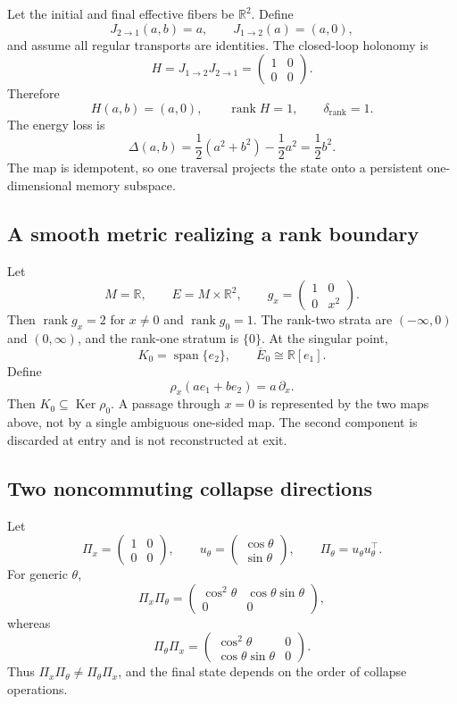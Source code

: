 \documentclass[11pt]{article}
\newcommand{\R}{\mathbb{R}}
\newcommand{\Ker}{\operatorname{Ker}}
\newcommand{\rank}{\operatorname{rank}}
\newcommand{\Span}{\operatorname{span}}
\begin{document}
Let the initial and final effective fibers be $\R^2$. Define
\[
J_{2\to1}(a,b)=a,
\qquad
J_{1\to2}(a)=(a,0),
\]
and assume all regular transports are identities. The closed-loop holonomy is
\[
H=J_{1\to2}J_{2\to1}
=\begin{pmatrix}1&0\\0&0\end{pmatrix}.
\]
Therefore
\[
H(a,b)=(a,0),
\qquad
\rank H=1,
\qquad
\delta_{\mathrm{rank}}=1.
\]
The energy loss is
\[
\Delta(a,b)=\frac12(a^2+b^2)-\frac12a^2=\frac12b^2.
\]
The map is idempotent, so one traversal projects the state onto a persistent
one-dimensional memory subspace.

\subsection{A smooth metric realizing a rank boundary}

Let
\[
M=\R,
\qquad
E=M\times\R^2,
\qquad
g_x=\begin{pmatrix}1&0\\0&x^2\end{pmatrix}.
\]
Then $\rank g_x=2$ for $x\ne0$ and $\rank g_0=1$. The rank-two strata are
$(-\infty,0)$ and $(0,\infty)$, and the rank-one stratum is $\{0\}$. At the
singular point,
\[
K_0=\Span\{e_2\},
\qquad
\overline E_0\cong\R[e_1].
\]
Define
\[
\rho_x(ae_1+be_2)=a\,\partial_x.
\]
Then $K_0\subseteq\Ker\rho_0$. A passage through $x=0$ is represented by the
two maps above, not by a single ambiguous one-sided map. The second component
is discarded at entry and is not reconstructed at exit.

\subsection{Two noncommuting collapse directions}

Let
\[
\Pi_x=\begin{pmatrix}1&0\\0&0\end{pmatrix},
\qquad
u_\theta=\begin{pmatrix}\cos\theta\\\sin\theta\end{pmatrix},
\qquad
\Pi_\theta=u_\theta u_\theta^\top.
\]
For generic $\theta$,
\[
\Pi_x\Pi_\theta
=\begin{pmatrix}
\cos^2\theta&\cos\theta\sin\theta\\
0&0
\end{pmatrix},
\]
whereas
\[
\Pi_\theta\Pi_x
=\begin{pmatrix}
\cos^2\theta&0\\
\cos\theta\sin\theta&0
\end{pmatrix}.
\]
Thus $\Pi_x\Pi_\theta\ne\Pi_\theta\Pi_x$, and the final state depends on the
order of collapse operations.
\end{document}
